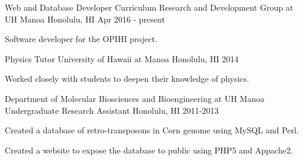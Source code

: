 \begin{cventries}
	\cventry
	{Web and Database Developer}
	{Curriculum Research and Development Group at UH Manoa}
	{Honolulu, HI}
	{Apr 2016 - present}
	{
		\begin{cvitems}
			\item {Software developer for the OPIHI project.}
		\end{cvitems}
	}
	
	\cventry
	{Physics Tutor}
	{University of Hawaii at Manoa}
	{Honolulu, HI}
	{2014}
	{
		\begin{cvitems}
			\item {Worked closely with students to deepen their knowledge of physics.}
		\end{cvitems}
	}
	
	\cventry
	{Department of Molecular Biosciences and Bioengineering at UH Manoa}
	{Undergraduate Research Assistant}
	{Honolulu, HI}
	{2011-2013}
	{
		\begin{cvitems}
			\item {Created a database of retro-transposons in Corn genome using MySQL and Perl.}
			\item {Created a website to expose the database to public using PHP5 and Appache2.}
		\end{cvitems}
	}
\end{cventries}

